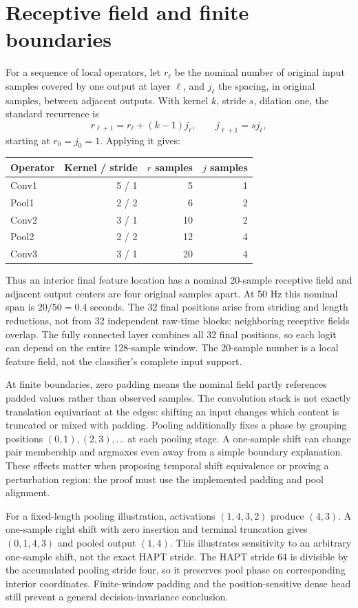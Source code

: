 \documentclass[11pt,a4paper]{article}
\begin{document}
\section{Receptive field and finite boundaries}
For a sequence of local operators, let $r_\ell$ be the nominal number of original input samples covered by one output at layer $\ell$, and $j_\ell$ the spacing, in original samples, between adjacent outputs. With kernel $k$, stride $s$, dilation one, the standard recurrence is
\[
 r_{\ell+1}=r_\ell+(k-1)j_\ell,\qquad j_{\ell+1}=s j_\ell,
\]
starting at $r_0=j_0=1$. Applying it gives:
\begin{center}\begin{tabular}{@{}lrrr@{}}\toprule Operator & Kernel / stride & $r$ samples & $j$ samples\\\midrule
Conv1 & 5 / 1 & 5 & 1\\
Pool1 & 2 / 2 & 6 & 2\\
Conv2 & 3 / 1 & 10 & 2\\
Pool2 & 2 / 2 & 12 & 4\\
Conv3 & 3 / 1 & 20 & 4\\\bottomrule\end{tabular}\end{center}
Thus an interior final feature location has a nominal 20-sample receptive field and adjacent output centers are four original samples apart. At 50 Hz this nominal span is $20/50=0.4$ seconds. The 32 final positions arise from striding and length reductions, not from 32 independent raw-time blocks: neighboring receptive fields overlap. The fully connected layer combines all 32 final positions, so each logit can depend on the entire 128-sample window. The 20-sample number is a local feature field, not the classifier's complete input support.

At finite boundaries, zero padding means the nominal field partly references padded values rather than observed samples. The convolution stack is not exactly translation equivariant at the edges: shifting an input changes which content is truncated or mixed with padding. Pooling additionally fixes a phase by grouping positions $(0,1),(2,3),\ldots$ at each pooling stage. A one-sample shift can change pair membership and argmaxes even away from a simple boundary explanation. These effects matter when proposing temporal shift equivalence or proving a perturbation region: the proof must use the implemented padding and pool alignment.

For a fixed-length pooling illustration, activations $(1,4,3,2)$ produce $(4,3)$. A one-sample right shift with zero insertion and terminal truncation gives $(0,1,4,3)$ and pooled output $(1,4)$. This illustrates sensitivity to an arbitrary one-sample shift, not the exact HAPT stride. The HAPT stride 64 is divisible by the accumulated pooling stride four, so it preserves pool phase on corresponding interior coordinates. Finite-window padding and the position-sensitive dense head still prevent a general decision-invariance conclusion.
\end{document}
